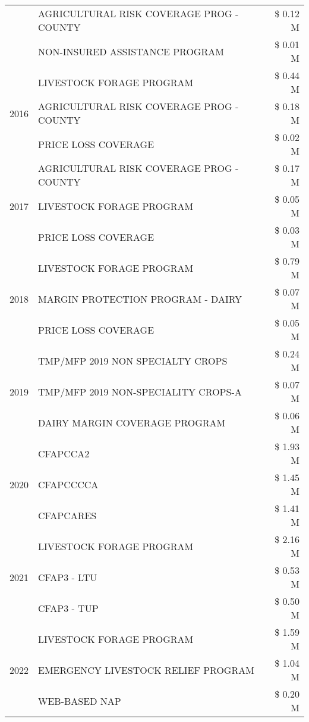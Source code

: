 \begin{tabular}{llr}
 & AGRICULTURAL RISK COVERAGE PROG - COUNTY & \$ 0.12 M \\
 & NON-INSURED ASSISTANCE PROGRAM & \$ 0.01 M \\
\cline{1-3}
\multirow[t]{3}{*}{2016} & LIVESTOCK FORAGE PROGRAM & \$ 0.44 M \\
 & AGRICULTURAL RISK COVERAGE PROG - COUNTY & \$ 0.18 M \\
 & PRICE LOSS COVERAGE & \$ 0.02 M \\
\cline{1-3}
\multirow[t]{3}{*}{2017} & AGRICULTURAL RISK COVERAGE PROG - COUNTY & \$ 0.17 M \\
 & LIVESTOCK FORAGE PROGRAM & \$ 0.05 M \\
 & PRICE LOSS COVERAGE & \$ 0.03 M \\
\cline{1-3}
\multirow[t]{3}{*}{2018} & LIVESTOCK FORAGE PROGRAM & \$ 0.79 M \\
 & MARGIN PROTECTION PROGRAM - DAIRY & \$ 0.07 M \\
 & PRICE LOSS COVERAGE & \$ 0.05 M \\
\cline{1-3}
\multirow[t]{3}{*}{2019} & TMP/MFP 2019 NON SPECIALTY CROPS & \$ 0.24 M \\
 & TMP/MFP 2019 NON-SPECIALITY CROPS-A & \$ 0.07 M \\
 & DAIRY MARGIN COVERAGE PROGRAM & \$ 0.06 M \\
\cline{1-3}
\multirow[t]{3}{*}{2020} & CFAPCCA2 & \$ 1.93 M \\
 & CFAPCCCCA & \$ 1.45 M \\
 & CFAPCARES & \$ 1.41 M \\
\cline{1-3}
\multirow[t]{3}{*}{2021} & LIVESTOCK FORAGE PROGRAM & \$ 2.16 M \\
 & CFAP3 - LTU & \$ 0.53 M \\
 & CFAP3 - TUP & \$ 0.50 M \\
\cline{1-3}
\multirow[t]{3}{*}{2022} & LIVESTOCK FORAGE PROGRAM & \$ 1.59 M \\
 & EMERGENCY LIVESTOCK RELIEF PROGRAM & \$ 1.04 M \\
 & WEB-BASED NAP & \$ 0.20 M \\
\cline{1-3}
\bottomrule
\end{tabular}
